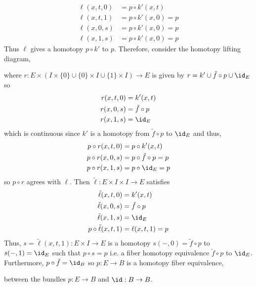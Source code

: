 \documentclass[12pt]{extarticle}
\begin{document}
\begin{align*}
\ell(x, t, 0) &= p \circ k'(x, t)
\\
\ell(x, t, 1) &= p \circ k'(x, 0) = p
\\
\ell(x, 0, s) &= p \circ k'(x, 0) = p
\\
\ell(x, 1, s) &= p \circ k'(x, 0) = p
\end{align*}
Thus $\ell$ gives a homotopy $p \circ k'$ to $p$. 
Therefore, consider the homotopy lifting diagram,
\begin{center}
\end{center} 
where $r : E \times (I \times \{ 0 \} \cup \{ 0\} \times I \cup \{1\} \times I) \to E$ is given by $r = k' \cup \tilde{f} \circ p \cup \id_E$ so 
\begin{align*}
r(x, t, 0) & = k'(x, t)
\\
r(x, 0, s) & = \tilde{f} \circ p
\\
r(x, 1, s) & = \id_E
\end{align*}
which is continuous since $k'$ is a homotopy from $\tilde{f} \circ p$ to $\id_E$ and thus,
\begin{align*}
p \circ r(x, t, 0) & = p \circ k'(x, t)
\\
p \circ r(x, 0, s) & = p \circ \tilde{f} \circ p = p
\\
p \circ r(x, 1, s) & = p \circ \id_E = p
\end{align*}
so $p \circ r$ agrees with $\ell$. Then $\tilde{\ell} : E \times I \times I \to E$ satisfies
\begin{align*}
\tilde{\ell}(x, t, 0) & = k'(x, t)
\\
\tilde{\ell}(x, 0, s) & = \tilde{f} \circ p
\\
\tilde{\ell}(x, 1, s) & = \id_E
\\
p \circ \tilde{\ell}(x, t, 1) & = \ell(x, t, 1) = p 
\end{align*}
Thus, $s = \tilde{\ell}(x, t, 1) : E \times I \to E$ is a homotopy $s(-,0) = \tilde{f} \circ p$ to $s(-,1) = \id_E$ such that $p \circ s = p$ i.e. a fiber homotopy equivalence $\tilde{f} \circ p$ to $\id_E$. Furthermore, $p \circ \tilde{f} = \id_B$ so $p : E \to B$ is a homotopy fiber equivalence,
\begin{center}
\end{center}
between the bundles $p : E \to B$ and $\id : B \to B$. 
\end{document}
